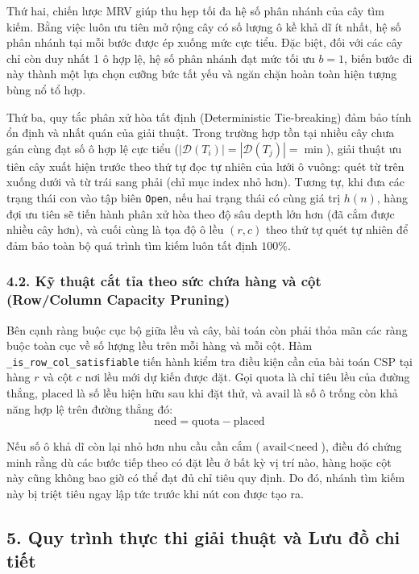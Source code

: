 \documentclass[a4paper,12pt]{article}
\begin{document}
Thứ hai, chiến lược MRV giúp thu hẹp tối đa hệ số phân nhánh của cây tìm kiếm. Bằng việc luôn ưu tiên mở rộng cây có số lượng ô kề khả dĩ ít nhất, hệ số phân nhánh tại mỗi bước được ép xuống mức cực tiểu. Đặc biệt, đối với các cây chỉ còn duy nhất 1 ô hợp lệ, hệ số phân nhánh đạt mức tối ưu $b = 1$, biến bước đi này thành một lựa chọn cưỡng bức tất yếu và ngăn chặn hoàn toàn hiện tượng bùng nổ tổ hợp.

Thứ ba, quy tắc phân xử hòa tất định (Deterministic Tie-breaking) đảm bảo tính ổn định và nhất quán của giải thuật. Trong trường hợp tồn tại nhiều cây chưa gán cùng đạt số ô hợp lệ cực tiểu ($|\mathcal{D}(T_i)| = |\mathcal{D}(T_j)| = \min$), giải thuật ưu tiên cây xuất hiện trước theo thứ tự đọc tự nhiên của lưới ô vuông: quét từ trên xuống dưới và từ trái sang phải (chỉ mục $\text{index}$ nhỏ hơn). Tương tự, khi đưa các trạng thái con vào tập biên \texttt{Open}, nếu hai trạng thái có cùng giá trị $h(n)$, hàng đợi ưu tiên sẽ tiến hành phân xử hòa theo độ sâu $\text{depth}$ lớn hơn (đã cắm được nhiều cây hơn), và cuối cùng là tọa độ ô lều $(r, c)$ theo thứ tự quét tự nhiên để đảm bảo toàn bộ quá trình tìm kiếm luôn tất định $100\%$.

\subsubsection*{4.2. Kỹ thuật cắt tỉa theo sức chứa hàng và cột (Row/Column Capacity Pruning)}
Bên cạnh ràng buộc cục bộ giữa lều và cây, bài toán còn phải thỏa mãn các ràng buộc toàn cục về số lượng lều trên mỗi hàng và mỗi cột. Hàm \texttt{\_is\_row\_col\_satisfiable} tiến hành kiểm tra điều kiện cần của bài toán CSP tại hàng $r$ và cột $c$ nơi lều mới dự kiến được đặt. Gọi $\text{quota}$ là chỉ tiêu lều của đường thẳng, $\text{placed}$ là số lều hiện hữu sau khi đặt thử, và $\text{avail}$ là số ô trống còn khả năng hợp lệ trên đường thẳng đó:
\begin{equation}
    \text{need} = \text{quota} - \text{placed}
\end{equation}

Nếu số ô khả dĩ còn lại nhỏ hơn nhu cầu cần cắm ($\text{avail} < \text{need}$), điều đó chứng minh rằng dù các bước tiếp theo có đặt lều ở bất kỳ vị trí nào, hàng hoặc cột này cũng không bao giờ có thể đạt đủ chỉ tiêu quy định. Do đó, nhánh tìm kiếm này bị triệt tiêu ngay lập tức trước khi nút con được tạo ra.

\subsection*{5. Quy trình thực thi giải thuật và Lưu đồ chi tiết}
\end{document}
